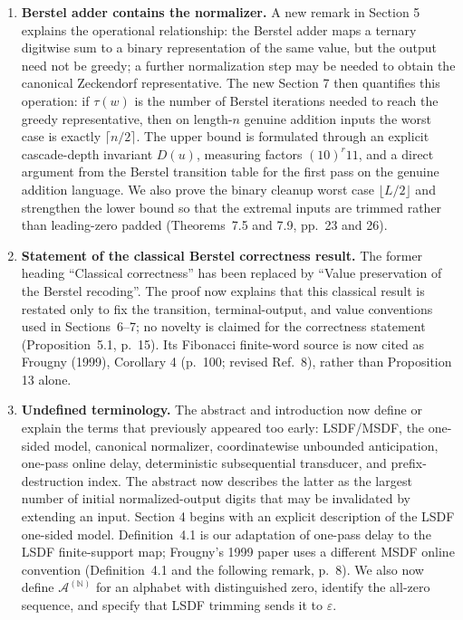 \documentclass[11pt]{article}
\begin{document}
\begin{enumerate}[leftmargin=*]
\item \textbf{Berstel adder contains the normalizer.}
A new remark in Section 5 explains the operational relationship: the Berstel
adder maps a ternary digitwise sum to a binary representation of the same
value, but the output need not be greedy; a further normalization step may be
needed to obtain the canonical Zeckendorf representative.  The new Section 7
then quantifies this operation: if $\tau(w)$ is the number of Berstel
iterations needed to reach the greedy representative, then on length-$n$
genuine addition inputs the worst case is exactly $\lceil n/2\rceil$.  The
upper bound is formulated through an explicit cascade-depth invariant
$D(u)$, measuring factors $(10)^r11$, and a direct argument from the Berstel
transition table for the first pass on the genuine addition language.  We also prove the
binary cleanup worst case $\lfloor L/2\rfloor$ and strengthen the lower bound
so that the extremal inputs are trimmed rather than leading-zero padded
(Theorems~7.5 and 7.9, pp.~23 and 26).

\item \textbf{Statement of the classical Berstel correctness result.}
The former heading ``Classical correctness'' has been replaced by ``Value
preservation of the Berstel recoding''.  The proof now explains that this
classical result is restated only to fix the transition, terminal-output, and
value conventions used in Sections~6--7; no novelty is claimed for the
correctness statement (Proposition~5.1, p.~15).  Its Fibonacci finite-word
source is now cited as Frougny (1999), Corollary 4 (p.~100; revised Ref.~8),
rather than Proposition 13 alone.

\item \textbf{Undefined terminology.}
The abstract and introduction now define or explain the terms that previously
appeared too early: LSDF/MSDF, the one-sided model, canonical normalizer,
coordinatewise unbounded anticipation, one-pass online delay, deterministic
subsequential transducer, and prefix-destruction index.  The abstract now
describes the latter as the largest number of initial normalized-output digits
that may be invalidated by extending an input.  Section 4 begins with
an explicit description of the LSDF one-sided model.  Definition~4.1 is our
adaptation of one-pass delay to the LSDF finite-support map; Frougny's 1999
paper uses a different MSDF online convention (Definition~4.1 and the
following remark, p.~8).  We also now define
$\mathcal A^{(\mathbb N)}$ for an alphabet with distinguished zero, identify
the all-zero sequence, and specify that LSDF trimming sends it to
$\varepsilon$.


\end{enumerate}
\end{document}
